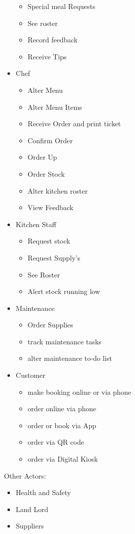 \documentclass{article}
\begin{document}
\begin{itemize}
\begin{itemize}
        \item {Special meal Requests}
        \item See roster
        \item Record feedback
        \item Receive Tips
    \end{itemize}
    \item {Chef}
    \begin{itemize}
        \item Alter Menu
        \item Alter Menu Items
        \item Receive Order and print ticket
        \item Confirm Order
        \item Order Up
        \item Order Stock
        \item Alter kitchen roster
        \item View Feedback
    \end{itemize}
    \item {Kitchen Staff}
    \begin{itemize}
        \item Request stock
        \item Request Supply's
        \item See Roster
        \item Alert stock running low
    \end{itemize}
    \item {Maintenance}
    \begin{itemize}
        \item Order Supplies
        \item track maintenance tasks
        \item alter maintenance to-do list
    \end{itemize}
    \item {Customer}
    \begin{itemize}
        \item make booking online or via phone
        \item order online via phone
        \item order or book via App
        \item order via QR code
        \item order via Digital Kiosk
    \end{itemize}
\end{itemize}
Other Actors:
\begin{itemize}
    \item {Health and Safety}
    \item {Land Lord}
    \item {Suppliers}
\end{itemize}
\end{document}
